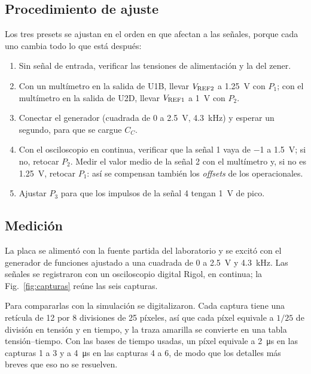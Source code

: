 \subsection{Procedimiento de ajuste}
\label{sec:ajuste}
Los tres presets se ajustan en el orden en que afectan a las señales, porque cada uno cambia todo lo que está después:
\begin{enumerate}[leftmargin=*, nosep]
    \item Sin señal de entrada, verificar las tensiones de alimentación y la del zener.
    \item Con un multímetro en la salida de U1B, llevar $V_{\mathrm{REF2}}$ a \SI{1,25}{\volt} con $P_1$; con el multímetro en la salida de U2D, llevar $V_{\mathrm{REF1}}$ a \SI{1}{\volt} con $P_2$.
    \item Conectar el generador (cuadrada de \SI{0}{} a \SI{2,5}{\volt}, \SI{4,3}{\kilo\hertz}) y esperar un segundo, para que se cargue $C_C$.
    \item Con el osciloscopio en continua, verificar que la señal 1 vaya de \SI{-1}{} a \SI{1,5}{\volt}; si no, retocar $P_2$. Medir el valor medio de la señal 2 con el multímetro y, si no es \SI{1,25}{\volt}, retocar $P_1$: así se compensan también los \emph{offsets} de los operacionales.
    \item Ajustar $P_3$ para que los impulsos de la señal 4 tengan \SI{1}{\volt} de pico.
\end{enumerate}

\subsection{Medición}
La placa se alimentó con la fuente partida del laboratorio y se excitó con el generador de funciones ajustado a una cuadrada de \SI{0}{} a \SI{2,5}{\volt} y \SI{4,3}{\kilo\hertz}. Las señales se registraron con un osciloscopio digital Rigol, en continua; la Fig.~\ref{fig:capturas} reúne las seis capturas.

Para compararlas con la simulación se digitalizaron. Cada captura tiene una retícula de 12 por 8 divisiones de 25 píxeles, así que cada píxel equivale a $1/25$ de división en tensión y en tiempo, y la traza amarilla se convierte en una tabla tensión--tiempo. Con las bases de tiempo usadas, un píxel equivale a \SI{2}{\micro\second} en las capturas 1 a 3 y a \SI{4}{\micro\second} en las capturas 4 a 6, de modo que los detalles más breves que eso no se resuelven.

